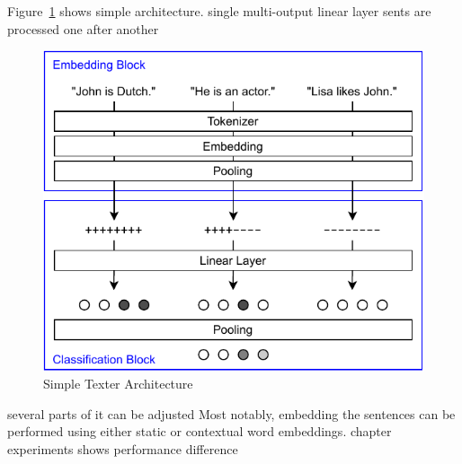 Figure~\ref{fig:4_approach/1_texter/1_simple_model/simple_architecture} shows simple architecture.
single multi-output linear layer
sents are processed one after another

\begin{figure}[t]
    \centering
    \includegraphics{4_approach/1_texter/1_simple_model/simple_architecture}
    \caption{Simple Texter Architecture}
    \label{fig:4_approach/1_texter/1_simple_model/simple_architecture}
\end{figure}

several parts of it can be adjusted
Most notably, embedding the sentences can be performed using either static or contextual word embeddings.
chapter experiments shows performance difference
